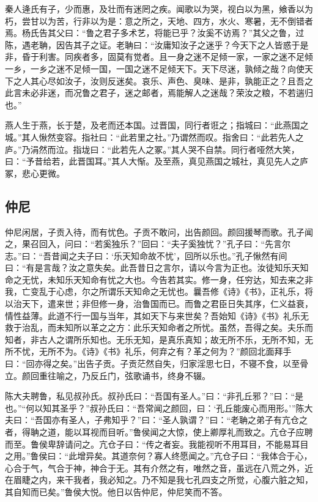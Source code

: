 \documentclass[]{article}
\begin{document}
秦人逄氏有子，少而惠，及壮而有迷罔之疾。闻歌以为哭，视白以为黑，飨香以为朽，尝甘以为苦，行非以为是：意之所之，天地、四方，水火、寒暑，无不倒错者焉。杨氏告其父曰：``鲁之君子多术艺，将能已乎？汝奚不访焉？''其父之鲁，过陈，遇老聃，因告其子之证。老聃曰：``汝庸知汝子之迷乎？今天下之人皆惑于是非，昏于利害。同疾者多，固莫有觉者。且一身之迷不足倾一家，一家之迷不足倾一乡，一乡之迷不足倾一国，一国之迷不足倾天下。天下尽迷，孰倾之哉？向使天下之人其心尽如汝子，汝则反迷矣。哀乐、声色、臭味、是非，孰能正之？且吾之此言未必非迷，而况鲁之君子，迷之邮者，焉能解人之迷哉？荣汝之粮，不若遄归也。''

燕人生于燕，长于楚，及老而还本国。过晋国，同行者诳之；指城曰：``此燕国之城。''其人愀然变容。指社曰：``此若里之社。''乃谓然而叹。指舍曰：``此若先人之庐。''乃涓然而泣。指垅曰：``此若先人之冢。''其人哭不自禁。同行者哑然大笑，曰：``予昔给若，此晋国耳。''其人大惭。及至燕，真见燕国之城社，真见先人之庐冢，悲心更微。

\hypertarget{header-n59}{%
\subsection{仲尼}\label{header-n59}}

仲尼闲居，子贡入待，而有忧色。子贡不敢问，出告颜回。颜回援琴而歌。孔子闻之，果召回入，问曰：``若奚独乐？''回曰：``夫子奚独忧？''孔子曰：``先言尔志。''曰：``吾昔闻之夫子曰：`乐天知命故不忧'，回所以乐也。''孔子愀然有间曰：``有是言哉？汝之意失矣。此吾昔日之言尔，请以今言为正也。汝徒知乐天知命之无忧，未知乐天知命有忧之大也。今告若其实。修一身，任穷达，知去来之非我，亡变乱于心虑，尔之所谓乐天知命之无忧也。曩吾修《诗》《书》，正礼乐，将以治天下，遣来世；非但修一身，治鲁国而已。而鲁之君臣日失其序，仁义益衰，情性益薄。此道不行一国与当年，其如天下与来世矣？吾始知《诗》《书》礼乐无救于治乱，而未知所以革之之方：此乐天知命者之所忧。虽然，吾得之矣。夫乐而知者，非古人之谓所乐知也。无乐无知，是真乐真知；故无所不乐，无所不知，无所不忧，无所不为。《诗》《书》礼乐，何弃之有？革之何为？''颜回北面拜手曰：``回亦得之矣。''出告子贡。子贡茫然自失，归家淫思七日，不寝不食，以至骨立。颜回重往喻之，乃反丘门，弦歌诵书，终身不辍。

陈大夫聘鲁，私见叔孙氏。叔孙氏曰：``吾国有圣人。''曰：``非孔丘邪？''曰：``是也。''``何以知其圣乎？''叔孙氏曰：``吾常闻之颜回，曰：`孔丘能废心而用形。'''陈大夫曰：``吾国亦有圣人，子弗知乎？''曰：``圣人孰谓？''曰：``老聃之弟子有亢仓之者，得聃之道，能以耳视而目听。''鲁侯闻之大惊，使上卿厚礼而致之。亢仓子应聘而至。鲁侯卑辞请问之。亢仓子曰：``传之者妄。我能视听不用耳目，不能易耳目之用。''鲁侯曰：``此增异矣。其道奈何？寡人终愿闻之。''亢仓子曰：``我体合于心，心合于气，气合于神，神合于无。其有介然之有，唯然之音，虽远在八荒之外，近在眉睫之内，来干我者，我必知之。乃不知是我七孔四支之所觉，心腹六脏之知，其自知而已矣。''鲁侯大悦。他日以告仲尼，仲尼笑而不答。
\end{document}
